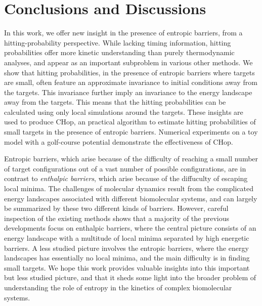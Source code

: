 \documentclass[english, aip, jcp, priprint, graphicx,floatfix]{revtex4-1}
\theoremstyle{plain}
\theoremstyle{definition}
\theoremstyle{plain}
\begin{document}
\section{Conclusions and Discussions}\label{sec:discussion}

In this work, we offer new insight in the presence of entropic barriers, from a hitting-probability perspective. While lacking timing information, hitting probabilities offer more kinetic understanding than purely thermodynamic analyses, and appear as an important subproblem in various other methods. We show that hitting probabilities, in the presence of entropic barriers where targets are small, often feature an approximate invariance to initial conditions away from the targets. This invariance further imply an invariance to the energy landscape away from the targets. This means that the hitting probabilities can be calculated using only local simulations around the targets. These insights are used to produce CHop, an practical algorithm to estimate hitting probabilities of small targets in the presence of entropic barriers. Numerical experiments on a toy model with a golf-course potential demonstrate the effectiveness of CHop.

Entropic barriers, which arise because of the difficulty of reaching a small number of target configurations out of a vast number of possible configurations, are in contrast to \emph{enthalpic barriers}, which arise because of the diffuculty of escaping local minima. The challenges of molecular dynamics result from the complicated energy landscapes associated with different biomolecular systems, and can largely be summarized by these two different kinds of barriers. However, careful inspection of the existing methods shows that a majority of the previous developments focus on enthalpic barriers, where the central picture consists of an energy landscape with a multitude of local minima separated by high energetic barriers. A less studied picture involves the entropic barriers, where the energy landscapes has essentially no local minima, and the main difficulty is in finding small targets. We hope this work provides valuable insights into this important but less studied picture, and that it sheds some light into the broader problem of understanding the role of entropy in the kinetics of complex biomolecular systems. 
\end{document}
